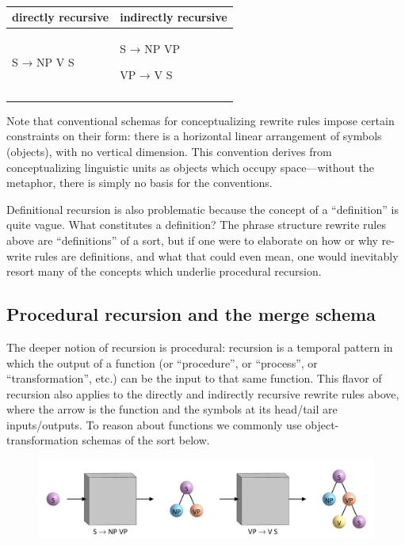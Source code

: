 \begin{table}
\begin{tabularx}{\textwidth}{XX}
\lsptoprule
directly recursive & indirectly recursive\\
\midrule 
S → NP V S & S → NP VP

VP →  V S\\
\lspbottomrule
\end{tabularx}
\caption{\missingcaption}\label{tab:5:2}
\end{table}
  Note that conventional schemas for conceptualizing rewrite rules impose certain constraints on their form: there is a horizontal linear arrangement of symbols (objects), with no vertical dimension. This convention derives from conceptualizing linguistic units as objects which occupy space—without the metaphor, there is simply no basis for the conventions.

  Definitional recursion is also problematic because the concept of a “definition” is quite vague. What constitutes a definition? The phrase structure rewrite rules above are “definitions” of a sort, but if one were to elaborate on how or why re-write rules are definitions, and what that could even mean, one would inevitably resort many of the concepts which underlie procedural recursion.

\subsection{Procedural recursion and the merge schema}

The deeper notion of recursion is procedural: recursion is a temporal pattern in which the output of a function (or “procedure”, or “process”, or “transformation”, etc.) can be the input to that same function. This flavor of recursion also applies to the directly and indirectly recursive rewrite rules above, where the arrow is the function and the symbols at its head/tail are inputs/outputs. To reason about functions we commonly use object-transformation schemas of the sort below.

  
\begin{figure}
\includegraphics[width=\textwidth]{figures/Tilsen-img107.png}
\caption{\missingcaption}
\label{fig:5:3}
\end{figure}
 

